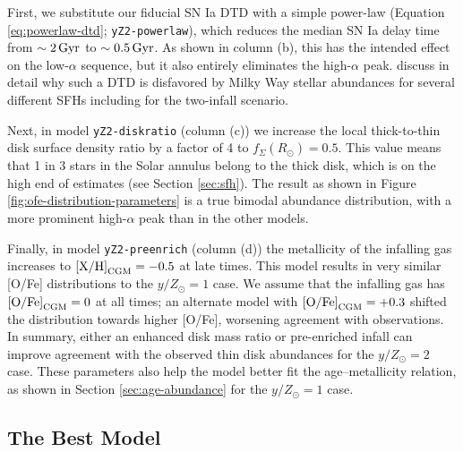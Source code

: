\documentclass[twocolumn,twocolappendix,linenumbers]{aastex631}
\newcommand{\mathXH}{{\rm [X/H]}}
\newcommand{\mathOFe}{{\rm [O/Fe]}}
\newcommand{\yZ}[1]{$y/Z_\odot=#1$}
\begin{document}
First, we substitute our fiducial SN Ia DTD with a simple power-law (Equation \ref{eq:powerlaw-dtd}; {\tt yZ2-powerlaw}),
which reduces the median SN Ia delay time from $\sim2\,{\rm Gyr}$ to $\sim0.5\,{\rm Gyr}$. As shown in column (b), this has the intended effect on the low-$\alpha$ sequence, but it also entirely eliminates the high-$\alpha$ peak. \citet{dubay_galactic_2024} discuss in detail why such a DTD is disfavored by Milky Way stellar abundances for several different SFHs including for the two-infall scenario.

Next, in model {\tt yZ2-diskratio} (column (c)) we increase the local thick-to-thin disk surface density ratio by a factor of 4 to $f_\Sigma(R_\odot)=0.5$. This value means that 1 in 3 stars in the Solar annulus belong to the thick disk, which is on the high end of estimates (see Section \ref{sec:sfh}). The result as shown in Figure \ref{fig:ofe-distribution-parameters} is a true bimodal abundance distribution, with a more prominent high-$\alpha$ peak than in the other models.

Finally, in model {\tt yZ2-preenrich} (column (d)) the metallicity of the infalling gas increases to $\mathXH_{\rm CGM}=-0.5$ at late times. This model results in very similar [O/Fe] distributions to the $y/Z_\odot=1$ case. We assume that the infalling gas has $\mathOFe_{\rm CGM}=0$ at all times; an alternate model with $\mathOFe_{\rm CGM}=+0.3$ shifted the distribution towards higher [O/Fe], worsening agreement with observations. In summary, either an enhanced disk mass ratio or pre-enriched infall can improve agreement with the observed thin disk abundances for the \yZ{2} case. These parameters also help the model better fit the age--metallicity relation, as shown in Section \ref{sec:age-abundance} for the \yZ{1} case.

\subsection{The Best Model}
\label{sec:ofe-feh-best}
\end{document}
